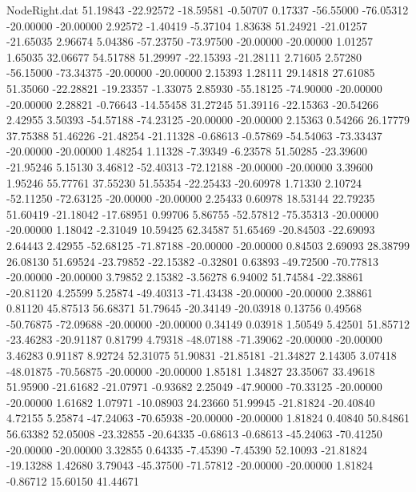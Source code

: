 \begin{filecontents}{NodeRight.dat}
  51.19843  -22.92572  -18.59581    -0.50707    0.17337  -56.55000  -76.05312  -20.00000  -20.00000    2.92572   -1.40419   -5.37104    1.83638
  51.24921  -21.01257  -21.65035     2.96674    5.04386  -57.23750  -73.97500  -20.00000  -20.00000    1.01257    1.65035   32.06677   54.51788
  51.29997  -22.15393  -21.28111     2.71605    2.57280  -56.15000  -73.34375  -20.00000  -20.00000    2.15393    1.28111   29.14818   27.61085
  51.35060  -22.28821  -19.23357    -1.33075    2.85930  -55.18125  -74.90000  -20.00000  -20.00000    2.28821   -0.76643  -14.55458   31.27245
  51.39116  -22.15363  -20.54266     2.42955    3.50393  -54.57188  -74.23125  -20.00000  -20.00000    2.15363    0.54266   26.17779   37.75388
  51.46226  -21.48254  -21.11328    -0.68613   -0.57869  -54.54063  -73.33437  -20.00000  -20.00000    1.48254    1.11328   -7.39349   -6.23578
  51.50285  -23.39600  -21.95246     5.15130    3.46812  -52.40313  -72.12188  -20.00000  -20.00000    3.39600    1.95246   55.77761   37.55230
  51.55354  -22.25433  -20.60978     1.71330    2.10724  -52.11250  -72.63125  -20.00000  -20.00000    2.25433    0.60978   18.53144   22.79235
  51.60419  -21.18042  -17.68951     0.99706    5.86755  -52.57812  -75.35313  -20.00000  -20.00000    1.18042   -2.31049   10.59425   62.34587
  51.65469  -20.84503  -22.69093     2.64443    2.42955  -52.68125  -71.87188  -20.00000  -20.00000    0.84503    2.69093   28.38799   26.08130
  51.69524  -23.79852  -22.15382    -0.32801    0.63893  -49.72500  -70.77813  -20.00000  -20.00000    3.79852    2.15382   -3.56278    6.94002
  51.74584  -22.38861  -20.81120     4.25599    5.25874  -49.40313  -71.43438  -20.00000  -20.00000    2.38861    0.81120   45.87513   56.68371
  51.79645  -20.34149  -20.03918     0.13756    0.49568  -50.76875  -72.09688  -20.00000  -20.00000    0.34149    0.03918    1.50549    5.42501
  51.85712  -23.46283  -20.91187     0.81799    4.79318  -48.07188  -71.39062  -20.00000  -20.00000    3.46283    0.91187    8.92724   52.31075
  51.90831  -21.85181  -21.34827     2.14305    3.07418  -48.01875  -70.56875  -20.00000  -20.00000    1.85181    1.34827   23.35067   33.49618
  51.95900  -21.61682  -21.07971    -0.93682    2.25049  -47.90000  -70.33125  -20.00000  -20.00000    1.61682    1.07971  -10.08903   24.23660
  51.99945  -21.81824  -20.40840     4.72155    5.25874  -47.24063  -70.65938  -20.00000  -20.00000    1.81824    0.40840   50.84861   56.63382
  52.05008  -23.32855  -20.64335    -0.68613   -0.68613  -45.24063  -70.41250  -20.00000  -20.00000    3.32855    0.64335   -7.45390   -7.45390
  52.10093  -21.81824  -19.13288     1.42680    3.79043  -45.37500  -71.57812  -20.00000  -20.00000    1.81824   -0.86712   15.60150   41.44671

\end{filecontents}
